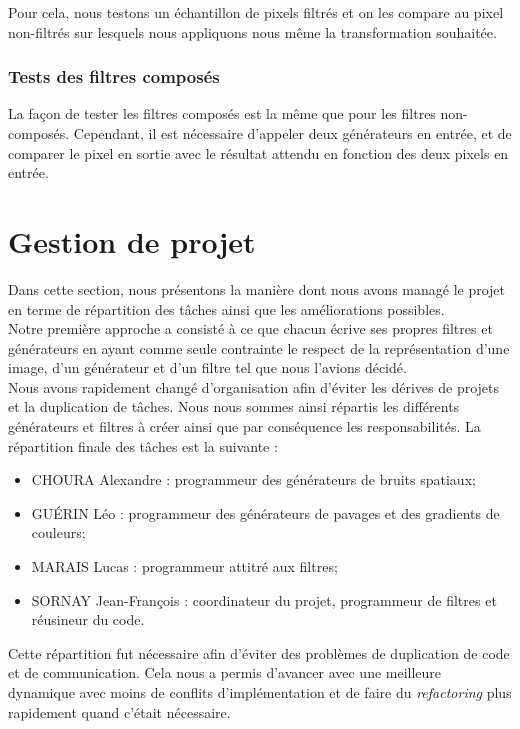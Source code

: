 \documentclass[11pt]{article}
\begin{document}
Pour cela, nous testons un échantillon de pixels filtrés et on les compare au pixel non-filtrés sur lesquels nous appliquons nous même la transformation souhaitée.

\subsubsection{Tests des filtres composés}

La façon de tester les filtres composés est la même que pour les filtres non-composés. Cependant, il est nécessaire d'appeler deux générateurs en entrée, et de comparer le pixel en sortie avec le résultat attendu en fonction des deux pixels en entrée.

\newpage
\section{Gestion de projet}
\label{section:project-management}

Dans cette section, nous présentons la manière dont nous avons managé le projet en terme de répartition des tâches ainsi que les améliorations possibles. \\

Notre première approche a consisté à ce que chacun écrive ses propres filtres et générateurs en ayant comme seule contrainte le respect de la représentation d'une image, d'un générateur et d'un filtre tel que nous l'avions décidé. \\

Nous avons rapidement changé d'organisation afin d'éviter les dérives de projets et la duplication de tâches. Nous nous sommes ainsi répartis les différents générateurs et filtres à créer ainsi que par conséquence les responsabilités. La répartition finale des tâches est la suivante : 
\begin{itemize}
\item CHOURA Alexandre : programmeur des générateurs de bruits spatiaux;
\item GUÉRIN Léo : programmeur des générateurs de pavages et des gradients de couleurs;
\item MARAIS Lucas : programmeur attitré aux filtres;
\item SORNAY Jean-François : coordinateur du projet, programmeur de filtres et réusineur du code. \\
\end{itemize}

Cette répartition fut nécessaire afin d'éviter des problèmes de duplication de code et de communication. Cela nous a permis d'avancer avec une meilleure dynamique avec moins de conflits d'implémentation et de faire du \textit{refactoring} plus rapidement quand c'était nécessaire. \\
\end{document}
